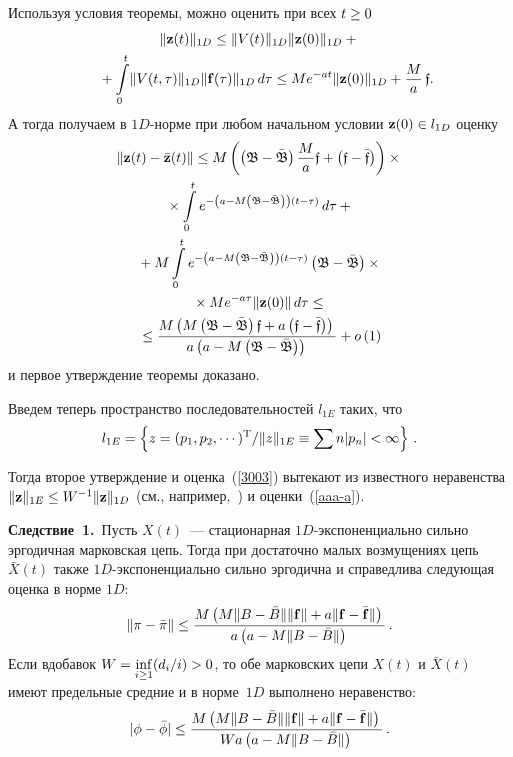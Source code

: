 \begin{multicols}{2}
Используя условия теоремы, можно оценить при всех $ t \hm\ge 0$
\begin{multline*}
 \|{\mathbf z} (t)\|_{1D} \le  \|V(t)\|_{1D}\|{\mathbf z} (0)\|_{1D} + {}\\
{} + \int\limits_0^t\! \|V(t, \tau)\|_{1D}\|{\bf f}(\tau)\|_{1D} \, d\tau      \le
 Me^{-at}\|{\mathbf z} (0)\|_{1D} + \displaystyle\frac{\displaystyle M\mathstrut}{\displaystyle a\mathstrut}\,  \mathfrak{f}.\hspace*{-9.4267pt}
\end{multline*}
А тогда получаем в $1D$-нор\-ме при любом начальном условии  $\vz (0) \hm\in l_{1D}$ оценку
\begin{multline}
\left\|{\mathbf z}(t)-\bar{{\mathbf z}}(t)\right\| \le
 M\left(\left(\mathfrak{B-\bar{B}}\right)\displaystyle\frac{\displaystyle M\mathstrut}{\displaystyle a\mathstrut}  \mathfrak{f}  + 
 \left(\mathfrak{f-\bar{f}}\right)\right) \times{}\\
 {}\times
\int\limits_0^t e^{-\left(a - M\left(\mathfrak{B-\bar{B}}\right)\right)(t-\tau)}\, d\tau +{} \\
{} + M \int\limits_0^t e^{-\left(a - M\left(\mathfrak{B-\bar{B}}\right)\right)(t-\tau)}
\left(\mathfrak{B-\bar{B}}\right)\times{}\\
{}\times  Me^{-a\tau}\|{\mathbf z} (0)\| \, d\tau \le {}\\
 {}\le \displaystyle\frac{\displaystyle M\left(M\left(\mathfrak{B-\bar{B}}\right) \mathfrak{f}  + a\left(\mathfrak{f-\bar{f}}\right)\right)\mathstrut}{\displaystyle a\left(a - M\left(\mathfrak{B-\bar{B}}\right)\right)\mathstrut} + o\left( 1 \right) 
  \label{aaa-a}
\end{multline}
и первое утверждение теоремы доказано.

\smallskip

Введем теперь пространство последовательностей $l_{1E}$ таких, что
$$
l_{1E}\hm=\left\{z=(p_1,p_2,\cdots)^{\mathrm{T}} / \|z\|_{1E}\hm\equiv\sum n |p_n| \hm<
\infty\right\}\,.
$$

Тогда второе утверждение и оценка~(\ref{3003}) вытекают из известного неравенства
$\|\vz\|_{1E}\hm\le W^{-1}\|\vz\|_{1D}$ (см., например,~\cite{z06}) и оценки~(\ref{aaa-a}).




\medskip

\noindent
\textbf{Следствие~1.}\
Пусть  $X(t)$~--- стационарная $1D$-экс\-по\-нен\-ци\-аль\-но сильно
эргодичная марковская цепь. Тогда при достаточно
малых возмущениях цепь $\bar{X}(t)$ также $1D$-экс\-по\-нен\-ци\-аль\-но
сильно эргодична и справедлива следующая оценка в норме $1D$:
\begin{equation*}
 \|{\bf \pi}- {\bar{\bf \pi}}\| \le
\displaystyle\frac{\displaystyle M\left(M\| B -\bar{B}\| \|{\bf f}\|  + a\|{\mathbf f}
-\bar{{\mathbf f}}\|\right)\mathstrut}{\displaystyle a\left(a - M\|B -\bar{B}\|\right)\mathstrut}\,.
\end{equation*}
Если вдобавок $W=\inf\limits_{i \ge 1} (d_i/i)\hm > 0$, то
обе марковских цепи $X(t)$ и $\bar{X}(t)$
имеют предельные средние и в норме~$1D$ выполнено неравенство:
\begin{equation*}
|\phi - \bar{\phi}|\le
\displaystyle\frac{\displaystyle M\left(M\| B -\bar{B}\| \|{\bf f}\|  + a\|{\mathbf f} -\bar{{\mathbf f}}\|\right)\mathstrut}{\displaystyle Wa\left(a - M\|B -\bar{B}\|\right)\mathstrut}\,.
\end{equation*}


\end{multicols}
